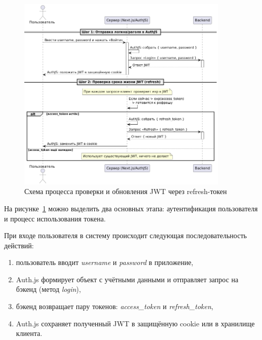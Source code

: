 \begin{figure}[h]
    \centering
    \includegraphics[width=0.9\textwidth]{static/diagrams/AuthRefresh.png}
    \caption{Схема процесса проверки и обновления JWT через refresh-токен}
    \label{fig:auth-refresh}
\end{figure}

На рисунке~\ref{fig:auth-refresh} можно выделить два основных этапа: аутентификация пользователя и процесс использования токена.

При входе пользователя в систему происходит следующая последовательность действий:
\begin{enumerate}
    \item пользователь вводит \textit{username} и \textit{password} в приложение,
    \item Auth.js формирует объект с учётными данными и отправляет запрос на бэкенд (метод \textit{login}),
    \item бэкенд возвращает пару токенов: \textit{access\_token} и \textit{refresh\_token},
    \item Auth.js сохраняет полученный JWT в защищённую cookie или в хранилище клиента.
\end{enumerate}

